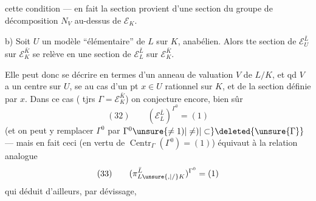  cette condition --- en fait la section provient d'une section du groupe de décomposition $N_V$ au-dessus de $\mathcal E_K$.

\noindent b) Soit $U$ un modèle ``élémentaire'' de $L$ sur $K$, anabélien. Alors tte section de $\mathcal E_U^{\bar L}$ sur $\mathcal E_K^{\bar K}$ se relève en une section de $\mathcal E_L^{\bar L}$ sur $\mathcal E_K^{\bar K}$.

Elle peut donc se décrire en termes d'un anneau de valuation $V$ de $L/K$, et qd $V$ a un centre sur $U$,  se  au cas d'un pt $x\in U$ rationnel sur $K$, et de la section définie par $x$. Dans ce cas ( tjrs $\Gamma=\mathcal E_K^{\bar K}$) on conjecture encore, bien sûr
\[
(32)\qquad (\mathcal E_L^{\bar L})^{\Gamma^0}=(1)
\]
(et on peut y remplacer $\Gamma^0$ par $\Gamma^0\unsure{\ne1)|\ne)|\subset}\deleted{\unsure{\Gamma}}$
--- mais en fait ceci (en vertu de $\operatorname{Centr}_\Gamma(\Gamma^0)=(1)$) équivaut à la relation analogue 
\[
(33)\qquad (\pi_{L\unsure{,|/}K}^{\bar L})^{\Gamma^0}=(1)
\]
qui  déduit d'ailleurs, par dévissage,
